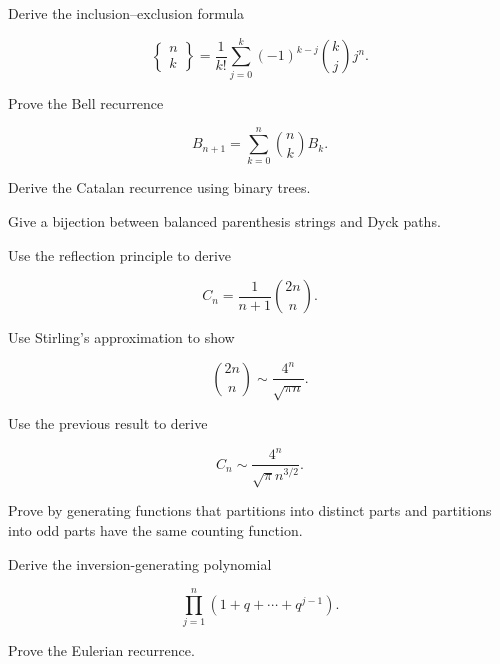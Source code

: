 \begin{exercise}[3]
Derive the inclusion--exclusion formula

\[
\left\{
\begin{matrix}
n\\
k
\end{matrix}
\right\}
=
\frac1{k!}
\sum_{j=0}^{k}
(-1)^{k-j}
\binom{k}{j}j^n.
\]
\end{exercise}

\begin{exercise}[3]
Prove the Bell recurrence

\[
B_{n+1}
=
\sum_{k=0}^{n}
\binom{n}{k}B_k.
\]
\end{exercise}

\begin{exercise}[3]
Derive the Catalan recurrence using binary trees.
\end{exercise}

\begin{exercise}[3]
Give a bijection between balanced parenthesis strings and Dyck paths.
\end{exercise}

\begin{exercise}[3]
Use the reflection principle to derive

\[
C_n
=
\frac1{n+1}
\binom{2n}{n}.
\]
\end{exercise}

\begin{exercise}[3]
Use Stirling's approximation to show

\[
\binom{2n}{n}
\sim
\frac{4^n}{\sqrt{\pi n}}.
\]
\end{exercise}

\begin{exercise}[3]
Use the previous result to derive

\[
C_n
\sim
\frac{4^n}{\sqrt{\pi}n^{3/2}}.
\]
\end{exercise}

\begin{exercise}[3]
Prove by generating functions that partitions into distinct parts and
partitions into odd parts have the same counting function.
\end{exercise}

\begin{exercise}[3]
Derive the inversion-generating polynomial

\[
\prod_{j=1}^{n}
(1+q+\cdots+q^{j-1}).
\]
\end{exercise}

\begin{exercise}[3]
Prove the Eulerian recurrence.
\end{exercise}

